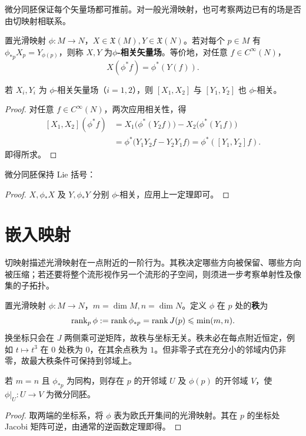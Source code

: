 微分同胚保证每个矢量场都可推前。对一般光滑映射，也可考察两边已有的场是否由切映射相联系。
\begin{definition}
    置光滑映射 $\phi:M\to N$，$X\in\mathfrak X(M),Y\in\mathfrak X(N)$。若对每个 $p\in M$ 有 $\phi_{*p}X_p=Y_{\phi(p)}$，则称 $X,Y$ 为\textbf{$\phi$-相关矢量场}。等价地，对任意 $f\in C^\infty(N)$，
    \[
        X(\phi^*f)=\phi^*(Y(f)).
    \]
\end{definition}

\begin{theorem}\label{chdm:thm_push-Poisson-related}
    若 $X_i,Y_i$ 为 $\phi$-相关矢量场（$i=1,2$），则 $[X_1,X_2]$ 与 $[Y_1,Y_2]$ 也 $\phi$-相关。
\end{theorem}
\begin{proof}
    对任意 $f\in C^\infty(N)$，两次应用相关性，得
    \[
    \begin{aligned}
        [X_1,X_2](\phi^*f)
        &=X_1\bigl(\phi^*(Y_2f)\bigr)-X_2\bigl(\phi^*(Y_1f)\bigr)\\
        &=\phi^*\bigl(Y_1Y_2f-Y_2Y_1f\bigr)
        =\phi^*([Y_1,Y_2]f).
    \end{aligned}
    \]
    即得所求。
\end{proof}

\begin{corollary}
    微分同胚保持 Lie 括号：
\end{corollary}
\begin{proof}
    $X,\phi_*X$ 及 $Y,\phi_*Y$ 分别 $\phi$-相关，应用上一定理即可。
\end{proof}

\section{嵌入映射}

切映射描述光滑映射在一点附近的一阶行为。其秩决定哪些方向被保留、哪些方向被压缩；若还要将整个流形视作另一个流形的子空间，则须进一步考察单射性及像集的子拓扑。

置光滑映射 $\phi:M\to N$，$m=\dim M,n=\dim N$。定义 $\phi$ 在 $p$ 处的\textbf{秩}为
\[
    \rank_p\phi:=\rank\phi_{*p}=\rank J(p)\leqslant\min(m,n).
\]
换坐标只会在 $J$ 两侧乘可逆矩阵，故秩与坐标无关。秩未必在每点附近恒定，例如 $t\mapsto t^3$ 在 $0$ 处秩为 $0$，在其余点秩为 $1$。但非零子式在充分小的邻域内仍非零，故最大秩条件可保持到邻域上。

\begin{theorem}[逆函数定理]\label{chdm:thm_inv-in-M}
    若 $m=n$ 且 $\phi_{*p}$ 为同构，则存在 $p$ 的开邻域 $U$ 及 $\phi(p)$ 的开邻域 $V$，使 $\phi|_U:U\to V$ 为微分同胚。
\end{theorem}
\begin{proof}
    取两端的坐标系，将 $\phi$ 表为欧氏开集间的光滑映射。其在 $p$ 的坐标处 Jacobi 矩阵可逆，由通常的逆函数定理即得。
\end{proof}

